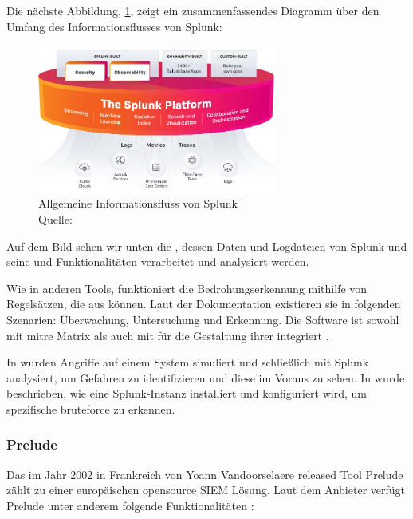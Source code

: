 Die nächste Abbildung, \ref{fig:Allgemein_Splunk}, zeigt ein zusammenfassendes Diagramm über den Umfang des Informationsflusses von Splunk:

\begin{figure}[H]
   \centering
   \includegraphics[width=0.7\textwidth]{assets/Splunk_informationsfluss.png}
   \caption[Allgemeine Informationsfluss von Splunk]
   {Allgemeine Informationsfluss von Splunk\\Quelle: \citep{Splunk_platform} }
   \label{fig:Allgemein_Splunk}
   \centering
\end{figure}

Auf dem Bild sehen wir unten die , dessen Daten und Logdateien von Splunk und seine  und Funktionalitäten verarbeitet und analysiert werden.

Wie in anderen Tools, funktioniert die Bedrohungserkennung mithilfe von Regelsätzen, die aus  können. Laut der Dokumentation existieren sie in folgenden Szenarien: Überwachung, Untersuchung und Erkennung. Die Software ist sowohl mit \gls{mitre} Matrix als auch mit  für die Gestaltung ihrer  integriert \citep{Splunk_usecases}. 

In \citep{Su_SplunkDDOS} wurden Angriffe auf einem System simuliert und schließlich mit Splunk analysiert, um Gefahren zu identifizieren und diese im Voraus zu sehen. In \citep{Selvaganesh_SplunkBruteForce} wurde beschrieben, wie eine Splunk-Instanz installiert und konfiguriert wird, um spezifische \gls{bruteforce} zu erkennen.
 
\subsubsection{Prelude}
Das im Jahr 2002 in Frankreich von Yoann Vandoorselaere released Tool Prelude zählt zu einer europäischen \gls{opensource} \gls{SIEM} Lösung. Laut dem Anbieter verfügt Prelude unter anderem folgende Funktionalitäten \citep{Prelude_SIEM}: 

